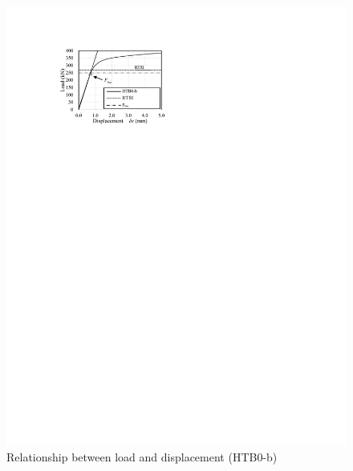 \begin{figure}
\begin{minipage}[t]{0.48\textwidth}
    \includegraphics{imgs/ch4/ld-htb0b.pdf}
    \caption{Relationship between load and displacement (HTB0-b)}
    \label{fig-ld-htb0b}
    \end{minipage}
    \begin{minipage}[t]{0.48\textwidth}

\end{minipage}
\end{figure}

